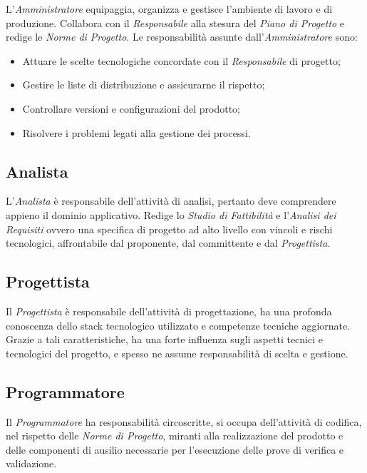 	L'\textit{Amministratore} equipaggia, organizza e gestisce l'ambiente di lavoro e di produzione. Collabora con il \textit{Responsabile} alla stesura del \textit{Piano di Progetto} e redige le \textit{Norme di Progetto}.
	Le responsabilità assunte dall'\textit{Amministratore} sono:

	\begin{itemize}

		\item Attuare le scelte tecnologiche concordate con il \textit{Responsabile} di progetto;
		\item Gestire le liste di distribuzione e assicurarne il rispetto;
		\item Controllare versioni e configurazioni del prodotto;
		\item Risolvere i problemi legati alla gestione dei processi.

	\end{itemize}

	\subsection{Analista}

	L'\textit{Analista} è responsabile dell'attività di analisi, pertanto deve comprendere appieno il dominio applicativo. Redige lo \textit{Studio di Fattibilità} e l'\textit{Analisi dei Requisiti} ovvero una specifica di progetto ad alto livello con vincoli e rischi tecnologici, affrontabile dal proponente, dal committente e dal \textit{Progettista}.


	\subsection{Progettista}

	Il \textit{Progettista} è responsabile dell'attività di progettazione, ha una profonda conoscenza dello stack tecnologico utilizzato e competenze tecniche aggiornate. Grazie a tali caratteristiche, ha una forte influenza sugli aspetti tecnici e tecnologici del progetto, e spesso ne assume responsabilità di scelta e gestione.


	\subsection{Programmatore}

	Il \textit{Programmatore} ha responsabilità circoscritte, si occupa dell'attività di codifica, nel rispetto delle \textit{Norme di Progetto}, miranti alla realizzazione del prodotto e delle componenti di ausilio necessarie per l'esecuzione delle prove di verifica e validazione.


